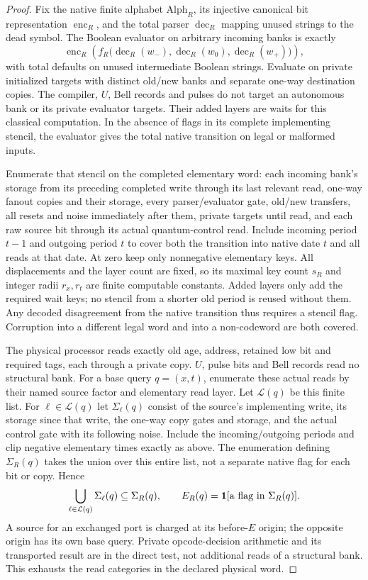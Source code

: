 \begin{proof}
Fix the native finite alphabet $\mathrm{Alph}_R$, its injective canonical bit representation $\operatorname{enc}_R$, and the total parser $\operatorname{dec}_R$ mapping unused strings to the dead symbol. The Boolean evaluator on arbitrary incoming banks is exactly
\[
 \operatorname{enc}_R\!\left(f_R\bigl(\operatorname{dec}_R(w_-),
 \operatorname{dec}_R(w_0),\operatorname{dec}_R(w_+)\bigr)\right),
\]
with total defaults on unused intermediate Boolean strings. Evaluate on private initialized targets with distinct old/new banks and separate one-way destination copies. The compiler, $U$, Bell records and pulses do not target an autonomous bank or its private evaluator targets. Their added layers are waits for this classical computation. In the absence of flags in its complete implementing stencil, the evaluator gives the total native transition on legal or malformed inputs.

Enumerate that stencil on the completed elementary word: each incoming bank's storage from its preceding completed write through its last relevant read, one-way fanout copies and their storage, every parser/evaluator gate, old/new transfers, all resets and noise immediately after them, private targets until read, and each raw source bit through its actual quantum-control read. Include incoming period $t-1$ and outgoing period $t$ to cover both the transition into native date $t$ and all reads at that date. At zero keep only nonnegative elementary keys. All displacements and the layer count are fixed, so its maximal key count $s_R$ and integer radii $r_x,r_t$ are finite computable constants. Added layers only add the required wait keys; no stencil from a shorter old period is reused without them. Any decoded disagreement from the native transition thus requires a stencil flag. Corruption into a different legal word and into a non-codeword are both covered.

The physical processor reads exactly old age, address, retained low bit and required tags, each through a private copy. $U$, pulse bits and Bell records read no structural bank. For a base query $q=(x,t)$, enumerate these actual reads by their named source factor and elementary read layer. Let $\mathcal L(q)$ be this finite list. For $\ell\in\mathcal L(q)$ let $\Sigma_\ell(q)$ consist of the source's implementing write, its storage since that write, the one-way copy gates and storage, and the actual control gate with its following noise. Include the incoming/outgoing periods and clip negative elementary times exactly as above. The enumeration defining $\Sigma_R(q)$ takes the union over this entire list, not a separate native flag for each bit or copy. Hence
\begin{equation}\label{eq:rawstencil}
 \bigcup_{\ell\in\mathcal L(q)}\Sigma_\ell(q)
 \subseteq\Sigma_R(q),\qquad
 E_R(q)=\mathbf 1[\text{a flag in }\Sigma_R(q)] .
\end{equation}
A source for an exchanged port is charged at its before-$E$ origin; the opposite origin has its own base query. Private opcode-decision arithmetic and its transported result are in the direct test, not additional reads of a structural bank. This exhausts the read categories in the declared physical word.


\end{proof}
